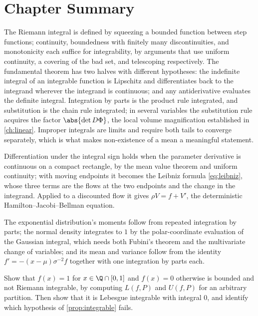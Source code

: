 \section{Chapter Summary}\label{sec:int-summary}

The Riemann integral is defined by squeezing a bounded function between step
functions; continuity, boundedness with finitely many discontinuities, and
monotonicity each suffice for integrability, by arguments that use uniform
continuity, a covering of the bad set, and telescoping respectively. The
fundamental theorem has two halves with different hypotheses: the indefinite
integral of an integrable function is Lipschitz and differentiates back to the
integrand wherever the integrand is continuous; and any antiderivative evaluates
the definite integral. Integration by parts is the product rule integrated, and
substitution is the chain rule integrated; in several variables the substitution
rule acquires the factor $\abs{\det D\Phi}$, the local volume magnification
established in \autoref{ch:linear}. Improper integrals are limits and require
both tails to converge separately, which is what makes non-existence of a mean a
meaningful statement.

Differentiation under the integral sign holds when the parameter derivative is
continuous on a compact rectangle, by the mean value theorem and uniform
continuity; with moving endpoints it becomes the Leibniz formula
\eqref{eq:leibniz}, whose three terms are the flows at the two endpoints and the
change in the integrand. Applied to a discounted flow it gives
$\rho V=f+V'$, the deterministic Hamilton--Jacobi--Bellman equation.

The exponential distribution's moments follow from repeated integration by parts;
the normal density integrates to $1$ by the polar-coordinate evaluation of the
Gaussian integral, which needs both Fubini's theorem and the multivariate change
of variables; and its mean and variance follow from the identity
$f'=-(x-\mu)\sigma^{-2}f$ together with one integration by parts each.

\begin{exercise}\label{ex:int-1}
	Show that $f(x)=1$ for $x\in\Q\cap[0,1]$ and $f(x)=0$ otherwise is bounded and
	not Riemann integrable, by computing $L(f,P)$ and $U(f,P)$ for an arbitrary
	partition. Then show that it is Lebesgue integrable with integral $0$, and
	identify which hypothesis of \autoref{prop:integrable} fails.
\end{exercise}

